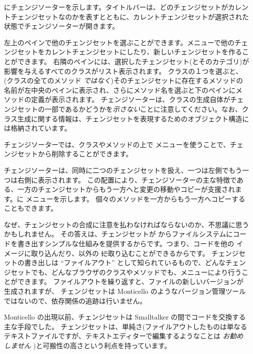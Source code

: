 \documentclass[a4paper,10pt,twoside]{book}
\begin{document}
 にチェンジソーターを示します。タイトルバーは、どのチェンジセットがカレントチェンジセットなのかを表すとともに、カレントチェンジセットが選択された状態でチェンジソーターが開きます。

左上のペインで他のチェンジセットを選ぶことができます。\actclick メニューで他のチェンジセットをカレントチェンジセットにしたり、新しいチェンジセットを作ることができます。
右隣のペインには、選択したチェンジセット(とそのカテゴリ)が影響を与えるすべてのクラスがリスト表示されます。
クラスの１つを選ぶと、(クラスの全てのメソッド \emph{ではなく})そのチェンジセットに存在するメソッドの名前が左中央のペインに表示され、さらにメソッド名を選ぶと下のペインにメソッドの定義が表示されます。
チェンジソーターは、クラスの生成自体がチェンジセットの一部であるかどうかを\emph{示さない}ことに注意してください。なお、クラス生成に関する情報は、チェンジセットを表現するためのオブジェクト構造には格納されています。

チェンジソーターでは、クラスやメソッドの上で \actclick メニューを使うことで、チェンジセットから削除することができます。

チェンジソーターは、同時に二つのチェンジセットを扱え、一つは左側でもう一つは右側に表示されます。
この配置により、チェンジソーターの主な特徴である、一方のチェンジセットからもう一方へと変更の移動やコピーが支援されます。に \actclick メニューを示します。
個々のメソッドを一方からもう一方へコピーすることもできます。

なぜ、チェンジセットの合成に注意を払わなければならないのか、不思議に思うかもしれません。
その答えは、チェンジセットが \pharo からファイルシステムにコードを書き出すシンプルな仕組みを提供するからです。つまり、コードを他の \pharo イメージに取り込んだり、\pharo 以外の \st に取り込むことができるからです。
チェンジセットの書き出しは ``ファイルアウト'' として知られているもので、どんなチェンジセットでも、どんなブラウザのクラスやメソッドでも、\actclick メニューにより行うことができます。
ファイルアウトを繰り返すと、ファイルの新しいバージョンが生成されますが、
チェンジセットは Monticello のようなバージョン管理ツールではないので、依存関係の追跡は行いません。

Monticello の出現以前、チェンジセットは Smalltalker の間でコードを交換する主な手段でした。
チェンジセットは、単純さ(ファイルアウトしたものは単なるテキストファイルですが、テキストエディターで編集するようなことは \emph{お勧めしません} )と可搬性の高さという利点を持っています。
\end{document}
